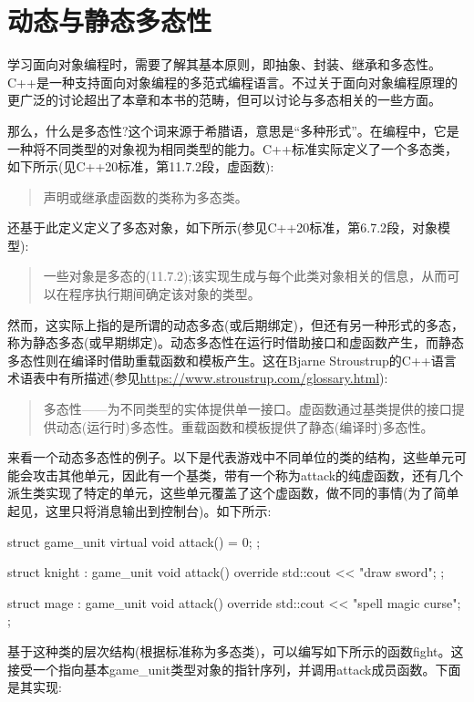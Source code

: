 \section{动态与静态多态性}
学习面向对象编程时，需要了解其基本原则，即抽象、封装、继承和多态性。C++是一种支持面向对象编程的多范式编程语言。不过关于面向对象编程原理的更广泛的讨论超出了本章和本书的范畴，但可以讨论与多态相关的一些方面。

那么，什么是多态性?这个词来源于希腊语，意思是“多种形式”。在编程中，它是一种将不同类型的对象视为相同类型的能力。C++标准实际定义了一个多态类，如下所示(见C++20标准，第11.7.2段，虚函数):

\begin{quote}
声明或继承虚函数的类称为多态类。
\end{quote}

还基于此定义定义了多态对象，如下所示(参见C++20标准，第6.7.2段，对象模型):

\begin{quote}
一些对象是多态的(11.7.2);该实现生成与每个此类对象相关的信息，从而可以在程序执行期间确定该对象的类型。
\end{quote}

然而，这实际上指的是所谓的动态多态(或后期绑定)，但还有另一种形式的多态，称为静态多态(或早期绑定)。动态多态性在运行时借助接口和虚函数产生，而静态多态性则在编译时借助重载函数和模板产生。这在Bjarne Stroustrup的C++语言术语表中有所描述(参见\url{https://www.stroustrup.com/glossary.html}):

\begin{quote}
多态性——为不同类型的实体提供单一接口。虚函数通过基类提供的接口提供动态(运行时)多态性。重载函数和模板提供了静态(编译时)多态性。
\end{quote}

来看一个动态多态性的例子。以下是代表游戏中不同单位的类的结构，这些单元可能会攻击其他单元，因此有一个基类，带有一个称为attack的纯虚函数，还有几个派生类实现了特定的单元，这些单元覆盖了这个虚函数，做不同的事情(为了简单起见，这里只将消息输出到控制台)。如下所示:

\begin{cpp}
struct game_unit
{
	virtual void attack() = 0;
};

struct knight : game_unit
{
	void attack() override
	{ std::cout << "draw sword\n"; }
};

struct mage : game_unit
{
	void attack() override
	{ std::cout << "spell magic curse\n"; }
};
\end{cpp}

基于这种类的层次结构(根据标准称为多态类)，可以编写如下所示的函数fight。这接受一个指向基本game\_unit类型对象的指针序列，并调用attack成员函数。下面是其实现:

